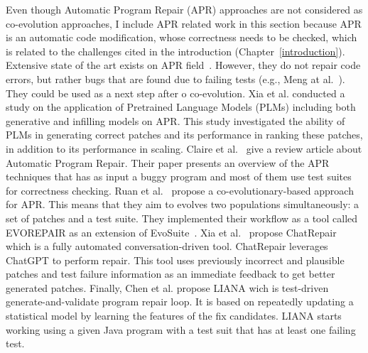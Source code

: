   Even though Automatic Program Repair (APR) approaches are not considered as co-evolution approaches, I include APR related work in this section because APR is an automatic code modification, whose correctness needs to be checked, which is related to the challenges cited in the introduction (Chapter~\ref{introduction}). 
  Extensive state of the art exists on APR field~\cite{goues2019automated,liu2020efficiency,monperrus2018automatic,gazzola2017automatic}. However, they do not repair code errors, but rather bugs that are found due to failing tests (e.g., Meng at al.~\cite{10.5555/2486788.2486855}). 
 They could be used as a next step after o co-evolution. 
Xia et al. \cite{10.1109/ICSE48619.2023.00129} conducted a study on the application of Pretrained Language Models (PLMs) including both generative and infilling models on APR. This study investigated the ability of PLMs in generating correct patches and its performance in ranking these patches, in addition to its performance in scaling.
Claire et al.~\cite{goues2019automated} give a review article about Automatic Program Repair. Their paper presents an overview of the APR techniques that has as input a buggy program and most of them use test suites for correctness checking. Ruan et al.~\cite{10638555} propose a co-evolutionary-based approach for APR. This means that they aim to evolves two populations simultaneously: a set of patches and a test suite. They implemented their workflow as a tool called EVOREPAIR as an extension of EvoSuite~\cite{fraser2011evosuite}.
 Xia et al.~\cite{10.1145/3650212.3680323} propose ChatRepair which is a fully automated conversation-driven tool. ChatRepair leverages ChatGPT to perform repair. This tool uses previously incorrect and plausible patches and test failure information as an immediate feedback to get better generated patches. Finally, Chen et al. \cite{9749899} propose LIANA wich is test-driven generate-and-validate program repair loop. It is based on repeatedly updating a statistical model by learning the features of the fix candidates. LIANA starts working using a given Java program with a test suit that has at least one failing test. 
 


 
